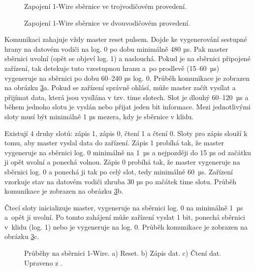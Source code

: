 \begin{figure}[H]
    \centering
    \def\svgwidth{\columnwidth}
    
    \caption{Zapojení 1-Wire sběrnice ve trojvodičovém provedení.}
    \label{fig:1-wire-sbernice-tri-vodice}
\end{figure}

\begin{figure}[H]
    \centering
    \def\svgwidth{\columnwidth}
    
    \caption{Zapojení 1-Wire sběrnice ve dvouvodičovém provedení.}
    \label{fig:1-wire-sbernice-dva-vodice}
\end{figure}

Komunikaci zahajuje vždy master reset pulsem. Dojde ke vygenerování sestupné hrany na datovém vodiči na log. 0 po dobu minimálně 480 µs. Pak master sběrnici uvolní (opět se objeví log. 1) a naslouchá. Pokud je na sběrnici připojené zařízení, tak detekuje tuto vzestupnou hranu a~po prodlevě (15–60~µs) vygeneruje na sběrnici po dobu 60–240 µs log. 0. Průběh komunikace je zobrazen na obrázku \ref{fig:1-wire-reset-vysilani-prijem-dat}a. Pokud se zařízení správně ohlásí, může master začít vysílat a přijímat data, která jsou vysílána v tzv. time slotech. Slot je dlouhý 60–120~µs a během jednoho slotu je vyslán nebo přijat jeden bit informace. Mezi jednotlivými sloty musí být minimálně 1 µs mezera, kdy je sběrnice v klidu. \cite{maly-1-wire-sbernice}

Existují 4 druhy slotů: zápis 1, zápis 0, čtení 1 a čtení 0. Sloty pro zápis slouží k tomu, aby master vyslal data do zařízení. Zápis 1 probíhá tak, že master vygeneruje na sběrnici log. 0 minimálně na 1~µs a nejpozději do 15 µs od začátku ji opět uvolní a ponechá volnou. Zápis 0 probíhá tak, že master vygeneruje na sběrnici log. 0 a ponechá ji tak po celý slot, tedy minimálně 60~µs. Zařízení vzorkuje stav na datovém vodiči zhruba 30 µs po začátek time slotu. Průběh komunikace je zobrazen na obrázku \ref{fig:1-wire-reset-vysilani-prijem-dat}b. \cite{maly-1-wire-sbernice}

Čtecí sloty inicializuje master, vygeneruje na sběrnici log. 0 na minimálně 1~µs a~opět ji uvolní. Po tomto zahájení může zařízení vyslat 1 bit, ponechá sběrnici v~klidu (log. 1) nebo je vygeneruje na log. 0. Průběh komunikace je zobrazen na obrázku \ref{fig:1-wire-reset-vysilani-prijem-dat}c. \cite{maly-1-wire-sbernice}


\begin{figure}[H]
    \centering
    \def\svgwidth{0.99\columnwidth}
    
    \caption[Průběhy na sběrnici 1-Wire.]{Průběhy na sběrnici 1-Wire.
    a) Reset. b) Zápis dat. c) Čtení dat. Upraveno z \cite{1-wire-sbernice-prubehy}.}
    \label{fig:1-wire-reset-vysilani-prijem-dat}
\end{figure}

